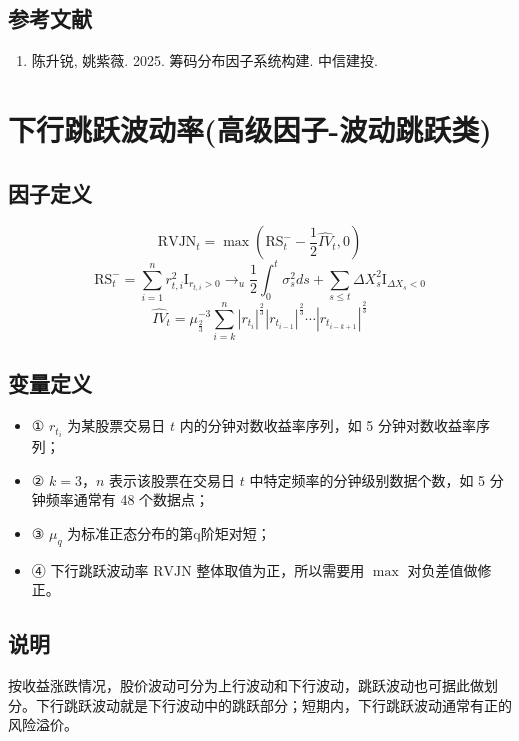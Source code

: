 \documentclass{article}
\begin{document}
\subsection{参考文献}
\begin{enumerate}
    \item 陈升锐, 姚紫薇. 2025. 筹码分布因子系统构建. 中信建投.
\end{enumerate}

\section{下行跳跃波动率(高级因子-波动跳跃类)}

\subsection{因子定义}

\begin{equation}
    \mathrm{RVJN}_t = \max\left(\mathrm{RS}_t^- - \frac{1}{2} \hat{IV}_t, 0\right)
\end{equation}
\begin{equation}
    \mathrm{RS}_t^- = \sum_{i=1}^n r_{t,i}^2 \mathrm{I}_{r_{t,i} > 0} \rightarrow_u \frac{1}{2} \int_0^t \sigma_s^2 ds + \sum_{s \leq t} \Delta X_s^2 \mathrm{I}_{\Delta X_s < 0}
\end{equation}
\begin{equation}
    \hat{IV}_t = \mu^{-3}_{\frac{2}{3}} \sum_{i=k}^n |r_{t_i}|^{\frac{2}{3}} |r_{t_{i-1}}|^{\frac{2}{3}} \cdots |r_{t_{i-k+1}}|^{\frac{2}{3}}
\end{equation}

\subsection{变量定义}
\begin{itemize}
    \item ① \( r_{t_i} \) 为某股票交易日 \( t \) 内的分钟对数收益率序列，如 5 分钟对数收益率序列；
    \item ② \( k=3 \)，\( n \) 表示该股票在交易日 \( t \) 中特定频率的分钟级别数据个数，如 5 分钟频率通常有 48 个数据点；
    \item ③ \( \mu_q \) 为标准正态分布的第q阶矩对短；
    \item ④ 下行跳跃波动率 \(\mathrm{RVJN}\) 整体取值为正，所以需要用 \(\max\) 对负差值做修正。
\end{itemize}

\subsection{说明}
按收益涨跌情况，股价波动可分为上行波动和下行波动，跳跃波动也可据此做划分。下行跳跃波动就是下行波动中的跳跃部分；短期内，下行跳跃波动通常有正的风险溢价。
\end{document}
